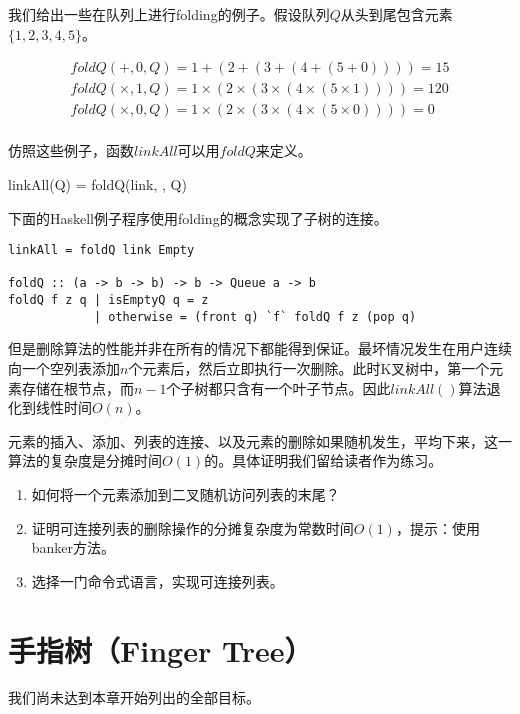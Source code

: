 \documentclass[UTF8]{article}
\begin{document}
我们给出一些在队列上进行folding的例子。假设队列$Q$从头到尾包含元素$\{ 1, 2, 3, 4, 5 \}$。

\[
\begin{array}{l}
foldQ(+, 0, Q) = 1 + (2 + (3 + (4 + (5 + 0)))) = 15 \\
foldQ(\times, 1, Q) = 1 \times (2 \times (3 \times (4 \times (5 \times 1)))) = 120 \\
foldQ(\times, 0, Q) = 1 \times (2 \times (3 \times (4 \times (5 \times 0)))) = 0 \\
\end{array}
\]

仿照这些例子，函数$linkAll$可以用$foldQ$来定义。

\be
linkAll(Q) = foldQ(link, \Phi, Q)
\ee

下面的Haskell例子程序使用folding的概念实现了子树的连接。

\begin{lstlisting}
linkAll = foldQ link Empty

foldQ :: (a -> b -> b) -> b -> Queue a -> b
foldQ f z q | isEmptyQ q = z
            | otherwise = (front q) `f` foldQ f z (pop q)
\end{lstlisting}

但是删除算法的性能并非在所有的情况下都能得到保证。最坏情况发生在用户连续向一个空列表添加$n$个元素后，然后立即执行一次删除。此时K叉树中，第一个元素存储在根节点，而$n-1$个子树都只含有一个叶子节点。因此$linkAll()$算法退化到线性时间$O(n)$。

元素的插入、添加、列表的连接、以及元素的删除如果随机发生，平均下来，这一算法的复杂度是分摊时间$O(1)$的。具体证明我们留给读者作为练习。

\begin{Exercise}
\begin{enumerate}
\item 如何将一个元素添加到二叉随机访问列表的末尾？

\item 证明可连接列表的删除操作的分摊复杂度为常数时间$O(1)$，提示：使用banker方法。

\item 选择一门命令式语言，实现可连接列表。
\end{enumerate}
\end{Exercise}

\section{手指树（Finger Tree）}
我们尚未达到本章开始列出的全部目标。
\end{document}
